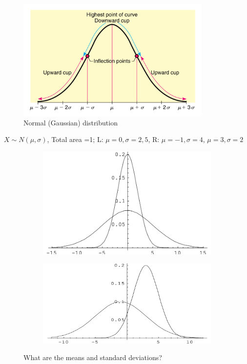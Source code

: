 \documentclass[12pt]{amsart}
\newcommand{\m}{\mu}
\newcommand{\s}{\sigma}
\begin{document}
{\begin{itemize}
\end{itemize}

\begin{figure}[h!]
  \includegraphics[width=3.8in]{img/normal_curve_Brase.png}
  \caption{Normal (Gaussian) distribution}
  \label{fig:normal}
\end{figure}

\color{blue}
$X\sim N(\m,\s)$, Total area =1;  L: $\m=0, \s=2, 5$, R: $\m=-1, \s=4$, $\m=3, \s=2$
\color{black}

\begin{figure}[h!]
  \centering
  \begin{subfigure}[b]{0.47\linewidth}
    \includegraphics[width=\linewidth]{img/normal_curves_compare_v1.png}
  \end{subfigure}
  \begin{subfigure}[b]{0.52\linewidth}
    \includegraphics[width=\linewidth]{img/normal_curves_compare_v2.png}
  \end{subfigure}
  \caption{What are the means and standard deviations?}
\end{figure}


}
\end{document}
